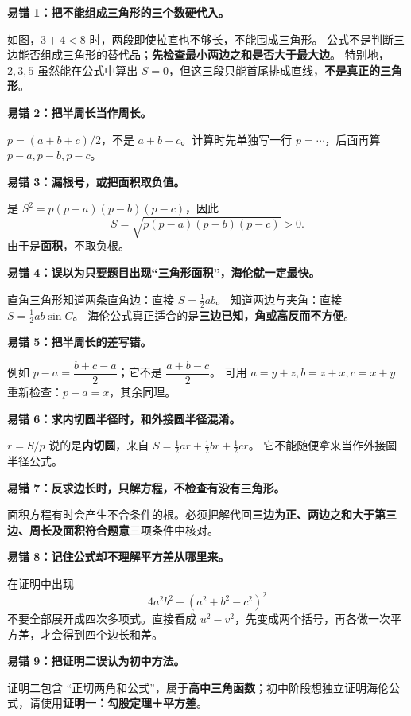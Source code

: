 \begin{trapbox}
  \textbf{\textcolor{CTrap}{易错 1：把不能组成三角形的三个数硬代入。}}


  如图，$3+4<8$ 时，两段即使拉直也不够长，不能围成三角形。
  公式不是判断三边能否组成三角形的替代品；\textbf{先检查最小两边之和是否大于最大边}。
  特别地，$2,3,5$ 虽然能在公式中算出 $S=0$，但这三段只能首尾排成直线，\textbf{不是真正的三角形}。

  \medskip
  \textbf{\textcolor{CTrap}{易错 2：把半周长当作周长。}}

  $p=(a+b+c)/2$，不是 $a+b+c$。计算时先单独写一行 $p=\cdots$，后面再算 $p-a,p-b,p-c$。

  \medskip
  \textbf{\textcolor{CTrap}{易错 3：漏根号，或把面积取负值。}}

  是 $S^2=p(p-a)(p-b)(p-c)$，因此
  \[
    S=\sqrt{p(p-a)(p-b)(p-c)}>0.
  \]
  由于是\textbf{面积}，不取负根。

  \medskip
  \textbf{\textcolor{CTrap}{易错 4：误以为只要题目出现“三角形面积”，海伦就一定最快。}}

  直角三角形知道两条直角边：直接 $S=\tfrac12 ab$。
  知道两边与夹角：直接 $S=\tfrac12 ab\sin C$。
  海伦公式真正适合的是\textbf{三边已知，角或高反而不方便}。

  \medskip
  \textbf{\textcolor{CTrap}{易错 5：把半周长的差写错。}}

  例如 $p-a=\dfrac{b+c-a}{2}$；它不是 $\dfrac{a+b-c}{2}$。
  可用 $a=y+z,b=z+x,c=x+y$ 重新检查：$p-a=x$，其余同理。

  \medskip
  \textbf{\textcolor{CTrap}{易错 6：求内切圆半径时，和外接圆半径混淆。}}

  $r=S/p$ 说的是\textbf{内切圆}，来自 $S=\tfrac12ar+\tfrac12br+\tfrac12cr$。
  它不能随便拿来当作外接圆半径公式。

  \medskip
  \textbf{\textcolor{CTrap}{易错 7：反求边长时，只解方程，不检查有没有三角形。}}

  面积方程有时会产生不合条件的根。必须把解代回\textbf{三边为正、两边之和大于第三边、周长及面积符合题意}三项条件中核对。

  \medskip
  \textbf{\textcolor{CTrap}{易错 8：记住公式却不理解平方差从哪里来。}}

  在证明中出现
  \[
   4a^2b^2-(a^2+b^2-c^2)^2
  \]
  不要全部展开成四次多项式。直接看成 $u^2-v^2$，先变成两个括号，再各做一次平方差，才会得到四个边长和差。

  \medskip
  \textbf{\textcolor{CTrap}{易错 9：把证明二误认为初中方法。}}

  证明二包含 ``正切两角和公式''，属于\textbf{高中三角函数}；初中阶段想独立证明海伦公式，请使用\textbf{证明一：勾股定理＋平方差}。
\end{trapbox}
